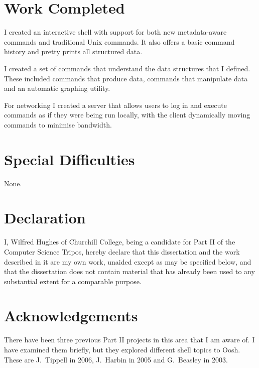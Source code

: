 \documentclass[12pt,twoside,notitlepage]{report}
\begin{document}
\section*{Work Completed}
I created an interactive shell with support for both new metadata-aware
commands and traditional Unix commands. It also offers a basic command
history and pretty prints all structured data.

I created a set of commands that understand the data structures that I
defined. These included commands that produce data, commands that
manipulate data and an automatic graphing utility.

For networking I created a server that allows users to log in and
execute commands as if they were being run locally, with the client
dynamically moving commands to minimise bandwidth.

\section*{Special Difficulties}
None.
 
\newpage
\section*{Declaration}

I, Wilfred Hughes of Churchill College, being a candidate for Part II
of the Computer Science Tripos, hereby declare that this dissertation
and the work described in it are my own work, unaided except as may be
specified below, and that the dissertation does not contain material
that has already been used to any substantial extent for a comparable
purpose.

\bigskip
{}

\medskip
{}

\cleardoublepage

\tableofcontents

\listoffigures

\newpage
\section*{Acknowledgements}

There have been three previous Part II projects in this area that I am
aware of. I have examined them briefly, but they explored different
shell topics to Oosh. These are J.\ Tippell in 2006, J.\ Harbin in
2005 and G.\ Beasley in 2003.

\end{document}
